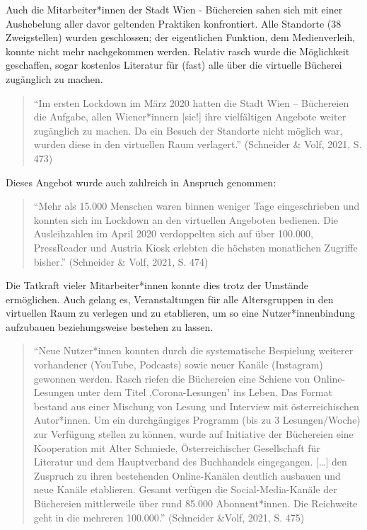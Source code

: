 \documentclass[a4paper,
fontsize=11pt,
oneside,
numbers=noperiodatend,
parskip=half-,
bibliography=totoc,
final
]{scrartcl}
\begin{document}
Auch die Mitarbeiter*innen der Stadt Wien - Büchereien sahen sich mit
einer Aushebelung aller davor geltenden Praktiken konfrontiert. Alle
Standorte (38 Zweigstellen) wurden geschlossen; der eigentlichen
Funktion, dem Medienverleih, konnte nicht mehr nachgekommen werden.
Relativ rasch wurde die Möglichkeit geschaffen, sogar kostenlos
Literatur für (fast) alle über die virtuelle Bücherei zugänglich zu
machen.

\begin{quote}
\enquote{Im ersten Lockdown im März 2020 hatten die Stadt Wien --
Büchereien die Aufgabe, allen Wiener*innern {[}sic!{]} ihre vielfältigen
Angebote weiter zugänglich zu machen. Da ein Besuch der Standorte nicht
möglich war, wurden diese in den virtuellen Raum verlagert.} (Schneider
\& Volf, 2021, S. 473)
\end{quote}

Dieses Angebot wurde auch zahlreich in Anspruch genommen:

\begin{quote}
\enquote{Mehr als 15.000 Menschen waren binnen weniger Tage
eingeschrieben und konnten sich im Lockdown an den virtuellen Angeboten
bedienen. Die Ausleihzahlen im April 2020 verdoppelten sich auf über
100.000, PressReader und Austria Kiosk erlebten die höchsten monatlichen
Zugriffe bisher.} (Schneider \& Volf, 2021, S. 474)
\end{quote}

Die Tatkraft vieler Mitarbeiter*innen konnte dies trotz der Umstände
ermöglichen. Auch gelang es, Veranstaltungen für alle Altersgruppen in
den virtuellen Raum zu verlegen und zu etablieren, um so eine
Nutzer*innenbindung aufzubauen beziehungsweise bestehen zu lassen.

\begin{quote}
\enquote{Neue Nutzer*innen konnten durch die systematische Bespielung
weiterer vorhandener (YouTube, Podcasts) sowie neuer Kanäle (Instagram)
gewonnen werden. Rasch riefen die Büchereien eine Schiene von
Online-Lesungen unter dem Titel ‚Corona-Lesungen‛ ins Leben. Das Format
bestand aus einer Mischung von Lesung und Interview mit österreichischen
Autor*innen. Um ein durchgängiges Programm (bis zu 3 Lesungen/Woche) zur
Verfügung stellen zu können, wurde auf Initiative der Büchereien eine
Kooperation mit Alter Schmiede, Österreichischer Gesellschaft für
Literatur und dem Hauptverband des Buchhandels eingegangen. {[}\ldots{]}
den Zuspruch zu ihren bestehenden Online-Kanälen deutlich ausbauen und
neue Kanäle etablieren. Gesamt verfügen die Social-Media-Kanäle der
Büchereien mittlerweile über rund 85.000 Abonnent*innen. Die Reichweite geht in die mehreren 100.000.} (Schneider \&Volf, 2021, S. 475)
\end{quote}
\end{document}
